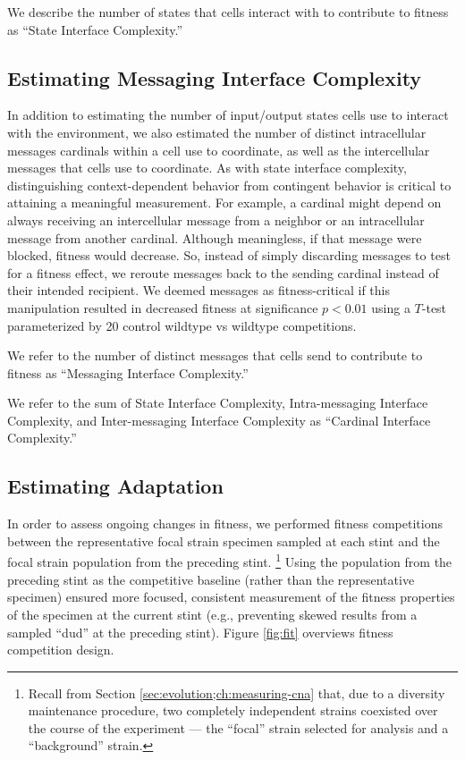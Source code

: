 We describe the number of states that cells interact with to contribute to fitness as ``State Interface Complexity.''

\subsection{Estimating Messaging Interface Complexity}
\label{sec:estimating-messaging-interface-complexity;ch:measuring-cna}

In addition to estimating the number of input/output states cells use to interact with the environment, we also estimated the number of distinct intracellular messages cardinals within a cell use to coordinate, as well as the intercellular messages that cells use to coordinate.
As with state interface complexity, distinguishing context-dependent behavior from contingent behavior is critical to attaining a meaningful measurement.
For example, a cardinal might depend on always receiving an intercellular message from a neighbor or an intracellular message from another cardinal.
Although meaningless, if that message were blocked, fitness would decrease.
So, instead of simply discarding messages to test for a fitness effect, we reroute messages back to the sending cardinal instead of their intended recipient.
We deemed messages as fitness-critical if this manipulation resulted in decreased fitness at significance $p < 0.01$ using a $T$-test parameterized by 20 control wildtype vs wildtype competitions.

We refer to the number of distinct messages that cells send to contribute to fitness as ``Messaging Interface Complexity.''

We refer to the sum of State Interface Complexity, Intra-messaging Interface Complexity, and Inter-messaging Interface Complexity as ``Cardinal Interface Complexity.''

\subsection{Estimating Adaptation}
\label{sec:measuring-adaptation;ch:measuring-cna}



In order to assess ongoing changes in fitness, we performed fitness competitions between the representative focal strain specimen sampled at each stint and the focal strain population from the preceding stint.%
\footnote{Recall from Section \ref{sec:evolution;ch:measuring-cna} that, due to a diversity maintenance procedure, two completely independent strains coexisted over the course of the experiment --- the ``focal'' strain selected for analysis and a ``background'' strain.}
Using the population from the preceding stint as the competitive baseline (rather than the representative specimen) ensured more focused, consistent measurement of the fitness properties of the specimen at the current stint (e.g., preventing skewed results from a sampled ``dud'' at the preceding stint).
Figure \ref{fig:fit} overviews fitness competition design.




